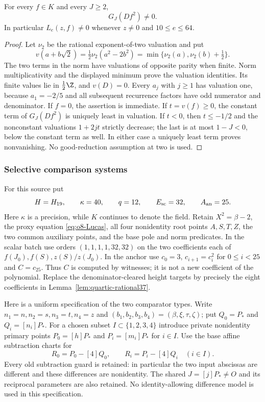 \begin{lemma}
\label{lem:quartic-reciprocal-nonzero}
For every $f\in K$ and every $J\ge2$,
\[
                 G_J(Df^2)\ne0.
\]
In particular $L_e(z,f)\ne0$ whenever $z\ne0$ and $10\le e\le64$.
\end{lemma}
\begin{proof}
Let $\nu_2$ be the rational exponent-of-two valuation and put
\[
 v(a+b\sqrt2)=\tfrac12\nu_2(a^2-2b^2)
             =\min\{\nu_2(a),\nu_2(b)+\tfrac12\}.
\]
The two terms in the norm have valuations of opposite parity when finite.
Norm multiplicativity and the displayed minimum prove the valuation
identities. Its finite values lie in $\tfrac12\Z$, and $v(D)=0$.
Every $a_j$ with $j\ge1$ has valuation one, because $a_1=-2/5$ and
all subsequent recurrence factors have odd numerator and denominator.
If $f=0$, the assertion is immediate. If $t=v(f)\ge0$, the constant
term of $G_J(Df^2)$ is uniquely least in valuation. If $t<0$, then
$t\le-1/2$ and the nonconstant valuations $1+2jt$ strictly decrease;
the last is at most $1-J<0$, below the constant term as well. In either
case a uniquely least term proves nonvanishing. No good-reduction
assumption at two is used.
\end{proof}

\subsubsection{Selective comparison systems}
For this source put
\begin{equation}\label{eq:quartic-selected-parameters}
 H=H_{19},\qquad \kappa=40,\qquad q=12,
 \qquad E_{\rm sc}=32,\qquad A_{\rm an}=25.
\end{equation}
Here $\kappa$ is a precision, while $K$ continues to denote the field.
Retain $X^2=\beta-2$, the proxy equation \eqref{eq:o8-Lucas}, all four
nonidentity root points $A,S,T,Z$, the two common auxiliary points,
and the base pole and norm predicates. In the scalar batch use orders
$(1,1,1,1,32,32)$ on the two coefficients each of
$f(J_0),f(S),z(S)/z(J_0)$. In the anchor use
$c_0=3$, $c_{i+1}=c_i^2$ for $0\le i<25$ and $C=c_{25}$.
Thus $C$ is computed by witnesses; it is not a new coefficient of the
polynomial. Replace the denominator-cleared height targets by precisely
the eight coefficients in Lemma~\ref{lem:quartic-rational37}.

Here is a uniform specification of the two comparator types. Write
$n_1=n,n_2=s,n_3=t,n_4=z$ and
$(b_1,b_2,b_3,b_4)=(\beta,\xi,\tau,\zeta)$; put
$Q_0=P_*$ and $Q_i=[n_i]P_*$. For a chosen subset
$I\subset\{1,2,3,4\}$ introduce private nonidentity primary points
$P_0=[h]P_*$ and $P_i=[m_i]P_*$ for $i\in I$. Use the base affine
subtraction charts for
\[
 R_0=P_0-[4]Q_0,\qquad R_i=P_i-[4]Q_i\quad(i\in I).
\]
Every old subtraction guard is retained: in particular the two input
abscissas are different and these differences are nonidentity. The
shared $J=[j]P_*\ne O$ and its reciprocal parameters are also retained.
No identity-allowing difference model is used in this specification.

